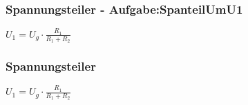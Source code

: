 \subsubsection{Spannungsteiler - Aufgabe:SpanteilUmU1} 
\begin{minipage}{0.45\textwidth} 
$ U_{1}  = U_{g} \cdot \frac{ R_{1} }{R_{1} +R_{2} } $\\ 
\end{minipage} 
\begin{minipage}{0.45\textwidth} 
 
\end{minipage} 
\subsubsection{Spannungsteiler} 
\begin{minipage}{0.45\textwidth} 
$ U_{1}  = U_{g} \cdot \frac{ R_{1} }{R_{1} +R_{2} } $\\ 
\end{minipage} 
\begin{minipage}{0.45\textwidth} 
 
\end{minipage} 
